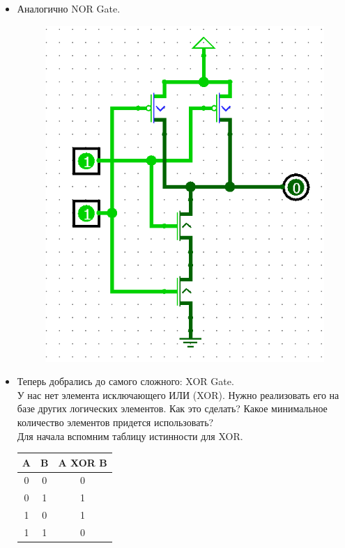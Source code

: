 \begin{itemize}
\begin{figure}[H]
\end{figure}
\item Аналогично NOR Gate.
\begin{figure}[H]
    \centering
    \includegraphics[width=0.5\linewidth]{Gates/NOR Gate.png}
\end{figure}
\item Теперь добрались до самого сложного: XOR Gate. \\

У нас нет элемента исключающего ИЛИ (XOR). Нужно реализовать его на базе других логических элементов. Как это сделать? Какое минимальное количество элементов придется использовать?\\
Для начала вспомним таблицу истинности для XOR.

\begin{table}[H] %
    \centering
    \begin{tabular}{|c|c|c|}
    \hline
    A & B & A XOR B \\
    \hline
    0 & 0 & 0 \\
    0 & 1 & 1 \\
    1 & 0 & 1 \\
    1 & 1 & 0 \\
    \hline
    \end{tabular}
\end{table}


\end{itemize}
